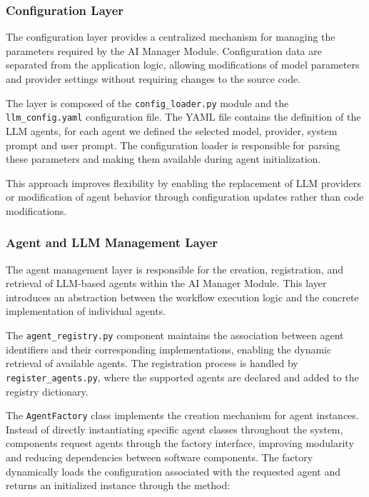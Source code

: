 \subsubsection{Configuration Layer}

The configuration layer provides a centralized mechanism for managing the parameters required by the AI Manager Module. Configuration data are separated from the application logic, allowing modifications of model parameters and provider settings without requiring changes to the source code.

The layer is composed of the \texttt{config\_loader.py} module and the \texttt{llm\_config.yaml} configuration file. The YAML file contains the definition of the LLM agents, for each agent we defined the selected model, provider, system prompt and user prompt. The configuration loader is responsible for parsing these parameters and making them available during agent initialization.

This approach improves flexibility by enabling the replacement of LLM providers or modification of agent behavior through configuration updates rather than code modifications.

\subsubsection{Agent and LLM Management Layer}

The agent management layer is responsible for the creation, registration, and retrieval of LLM-based agents within the AI Manager Module. This layer introduces an abstraction between the workflow execution logic and the concrete implementation of individual agents.

The \texttt{agent\_registry.py} component maintains the association between agent identifiers and their corresponding implementations, enabling the dynamic retrieval of available agents. The registration process is handled by \texttt{register\_agents.py}, where the supported agents are declared and added to the registry dictionary.

The \texttt{AgentFactory} class implements the creation mechanism for agent instances. Instead of directly instantiating specific agent classes throughout the system, components request agents through the factory interface, improving modularity and reducing dependencies between software components. The factory dynamically loads the configuration associated with the requested agent and returns an initialized instance through the method:

